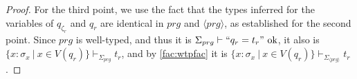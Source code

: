 \begin{lemma}
\begin{proof}
For the third point, we use the fact that the types inferred for the variables of $q_{\zeta_r}$ and $q_r$ are identical in $prg$ and $\langle prg \rangle$, as established for the second point. Since $prg$ is well-typed, and thus it is $\Sigma_{prg} \vdash `` q_r = t_r " \textrm{ ok}$, it also is $\{ x : \sigma_x ~ | ~ x \in V(q_r) \} \vdash_{\Sigma_{prg}} t_r$, and by \autoref{fac:wtpfac} it is $\{ x : \sigma_x ~ | ~ x \in V(q_r) \} \vdash_{\Sigma_{\langle prg \rangle}} t_r$.
\end{proof}
\end{lemma}

